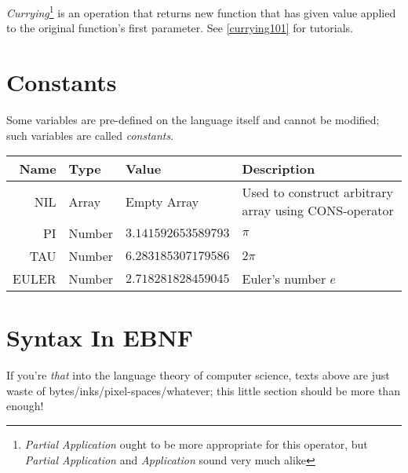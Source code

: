\emph{Currying}\footnote{\emph{Partial Application} ought to be more appropriate for this operator, but \emph{Partial Application} and \emph{Application} sound very much alike} is an operation that returns new function that has given value applied to the original function's first parameter. See \ref{currying101} for tutorials.

\section{Constants}

Some variables are pre-defined on the language itself and cannot be modified; such variables are called \emph{constants}.

\begin{tabulary}{\textwidth}{rllL}
Name & Type & Value & Description \\
\hline
NIL & Array & Empty Array & Used to construct arbitrary array using CONS-operator \\
PI & Number & $3.141592653589793$ & $\pi$ \\
TAU & Number & $6.283185307179586$ & $2 \pi$ \\
EULER & Number & $2.718281828459045$ & Euler's number $e$ \\
\end{tabulary}

\section{Syntax In EBNF}

If you're \emph{that} into the language theory of computer science, texts above are just waste of bytes/inks/pixel-spaces/whatever; this little section should be more than enough!


